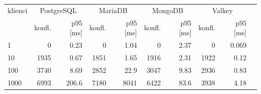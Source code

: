 \begin{tabular}{lrrrrrrrrr}
\toprule
klienci & \multicolumn{2}{c}{PostgreSQL} & \multicolumn{2}{c}{MariaDB} & \multicolumn{2}{c}{MongoDB} & \multicolumn{2}{c}{Valkey} \\
 & konfl. & p95 [ms] & konfl. & p95 [ms] & konfl. & p95 [ms] & konfl. & p95 [ms] \\
\midrule
1 & \num{0} & \num{0.23} & \num{0} & \num{1.04} & \num{0} & \num{2.37} & \num{0} & \num{0.069} \\
10 & \num{1935} & \num{0.67} & \num{1851} & \num{1.65} & \num{1916} & \num{2.31} & \num{1922} & \num{0.12} \\
100 & \num{3740} & \num{8.69} & \num{2852} & \num{22.9} & \num{3047} & \num{9.83} & \num{2936} & \num{0.83} \\
1000 & \num{6993} & \num{206.6} & \num{7180} & \num{8041} & \num{6422} & \num{83.6} & \num{3938} & \num{4.18} \\
\bottomrule
\end{tabular}
